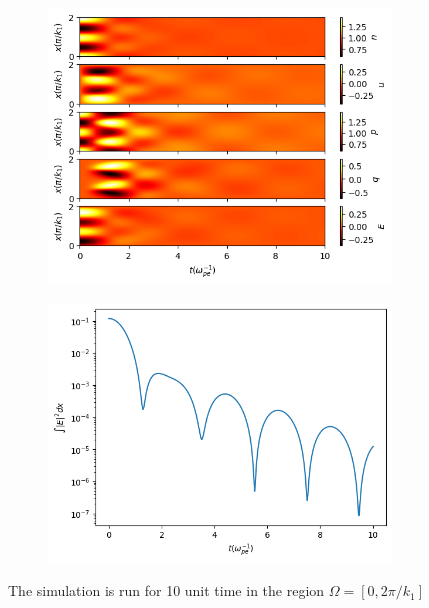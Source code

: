 \documentclass{article}
\begin{document}
    \begin{figure} [H]
        \centering
        \begin{subfigure}[b]{0.5\textwidth}
            \includegraphics[width=\textwidth]{img/simulation_fields.png}    
        \end{subfigure}%
        \begin{subfigure}[b]{0.5\textwidth}
            \includegraphics[width=\textwidth]{img/simulation_energy.png}    
        \end{subfigure}
        \caption{The simulation is run for 10 unit time in the region $\Omega=[0,2\pi/k_1]$}
        \label{fig:simulation_data}
    \end{figure}
\end{document}
